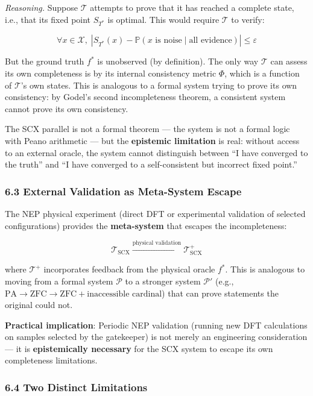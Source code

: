 \documentclass[
  12pt,
]{article}
\begin{document}
\emph{Reasoning.} Suppose \(\mathcal{T}\) attempts to prove that it has
reached a complete state, i.e., that its fixed point \(S_{T^*}\) is
optimal. This would require \(\mathcal{T}\) to verify:

\[\forall x \in \mathcal{X}, \; |S_{T^*}(x) - \mathbb{P}(x \text{ is noise} \mid \text{all evidence})| \leq \varepsilon\]

But the ground truth \(f^*\) is unobserved (by definition). The only way
\(\mathcal{T}\) can assess its own completeness is by its internal
consistency metric \(\Phi\), which is a function of \(\mathcal{T}\)'s
own states. This is analogous to a formal system trying to prove its own
consistency: by Godel's second incompleteness theorem, a consistent
system cannot prove its own consistency.

The SCX parallel is not a formal theorem --- the system is not a formal
logic with Peano arithmetic --- but the \textbf{epistemic limitation} is
real: without access to an external oracle, the system cannot
distinguish between ``I have converged to the truth'' and ``I have
converged to a self-consistent but incorrect fixed point.''

\subsubsection{6.3 External Validation as Meta-System
Escape}\label{external-validation-as-meta-system-escape}

The NEP physical experiment (direct DFT or experimental validation of
selected configurations) provides the \textbf{meta-system} that escapes
the incompleteness:

\[\mathcal{T}_{\text{SCX}} \xrightarrow{\text{physical validation}} \mathcal{T}^+_{\text{SCX}}\]

where \(\mathcal{T}^+\) incorporates feedback from the physical oracle
\(f^*\). This is analogous to moving from a formal system
\(\mathcal{P}\) to a stronger system \(\mathcal{P}'\) (e.g.,
\(\text{PA} \to \text{ZFC} \to \text{ZFC} + \text{inaccessible cardinal}\))
that can prove statements the original could not.

\textbf{Practical implication}: Periodic NEP validation (running new DFT
calculations on samples selected by the gatekeeper) is not merely an
engineering consideration --- it is \textbf{epistemically necessary} for
the SCX system to escape its own completeness limitations.

\subsubsection{6.4 Two Distinct
Limitations}\label{two-distinct-limitations}
\end{document}
